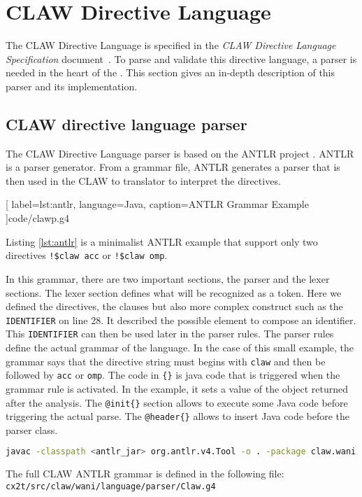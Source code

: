 \chapter{CLAW Directive Language}
The CLAW Directive Language is specified in the \textit{CLAW Directive Language
Specification} document~\cite{claw:specification}. To parse and validate
this directive language, a parser is needed in the heart of the \clawfcomp.
This section gives an in-depth description of this parser and its
implementation.

\section{CLAW directive language parser}
The CLAW Directive Language parser is based on the ANTLR project
\cite{Parr:2013:DAR:2501720}. ANTLR is a parser generator. From a grammar file,
ANTLR generates a parser that is then used in the CLAW \xcodemlf to \xcodeml
translator to interpret the directives.


  [
    label=lst:antlr,
    language=Java,
    caption=ANTLR Grammar Example
  ]{code/clawp.g4}

Listing \ref{lst:antlr} is a minimalist ANTLR example that support only two
directives \lstinline|!$claw acc| or \lstinline|!$claw omp|.

In this grammar, there are two important sections, the parser and the lexer
sections. The lexer section defines what will be recognized as a token. Here
we defined the directives, the clauses but also more complex construct such as
the \lstinline|IDENTIFIER| on line 28. It described the possible element to
compose an identifier. This \lstinline|IDENTIFIER| can then be used later in
the parser rules.
The parser rules define the actual grammar of the language. In the case
of this small example, the grammar says that the directive string must begins
with \lstinline|claw| and then be followed by \lstinline|acc| or
\lstinline|omp|. The code in \lstinline|{}| is java code that is triggered
when the grammar rule is activated. In the example, it sets a value of the
object returned after the analysis.
The \lstinline|@init{}| section allows to execute some Java code before
triggering the actual parse. The \lstinline|@header{}| allows to insert Java
code before the parser class.

\begin{lstlisting}[label=lst:antlr_cmd,
  caption=ANTLR parser generation command, language=bash]
javac -classpath <antlr_jar> org.antlr.v4.Tool -o . -package claw.wani.language.parser Claw.g4
\end{lstlisting}

The full CLAW ANTLR grammar is defined in the following file:
\lstinline|cx2t/src/claw/wani/language/parser/Claw.g4|
